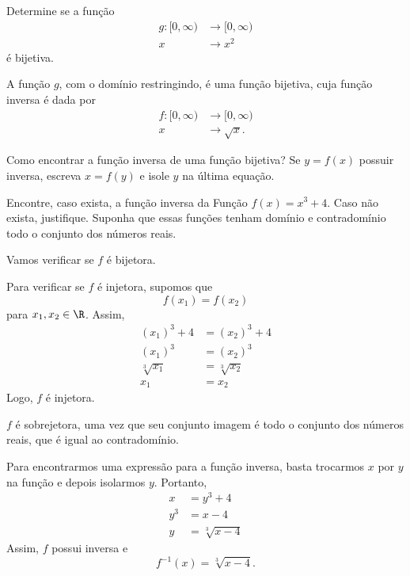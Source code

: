 \begin{example}
  Determine se a função
  \begin{align*}
    g\colon [0, \infty) & \to [0, \infty) \\
    x                   & \to  x^2
  \end{align*}
  é bijetiva.

  \solution
  A função $g$, com o domínio restringindo, é uma função bijetiva,
  cuja função inversa é dada por
  \begin{align*}
    f\colon [0, \infty) & \to [0, \infty) \\
    x                   & \to \sqrt{x}.
  \end{align*}
\end{example}

Como encontrar a função inversa de uma função bijetiva? Se $y=f(x)$ possuir
inversa, escreva $x=f(y)$ e isole $y$ na última equação.

\begin{example}
  Encontre, caso exista, a função inversa da Função
  \(
    f(x) = x^3 + 4
  \).
  Caso não exista, justifique. Suponha que essas funções tenham domínio e
  contradomínio todo o conjunto dos números reais.

  \solution
  Vamos verificar se $f$ é bijetora.

  Para verificar se $f$ é injetora, supomos que
  \[
    f(x_1) = f(x_2)
  \]
  para $x_1, x_2 \in \R$. Assim,
  \begin{align*}
    (x_1)^3+4     & = (x_2)^3+4     \\
    (x_1)^3       & = (x_2)^3       \\
    \sqrt[3]{x_1} & = \sqrt[3]{x_2} \\
    x_1           & = x_2
  \end{align*}
  Logo, $f$ é injetora.

  $f$ é sobrejetora, uma vez que seu conjunto imagem é todo o
  conjunto dos números reais, que é igual ao contradomínio.

  Para encontrarmos uma expressão para a função inversa, basta trocarmos $x$
  por $y$ na função e depois isolarmos $y$. Portanto,
  \begin{align*}
    x   & = y^3+4               \\
    y^3 & = x-4                 \\
    y   & = \sqrt[3]{x-4}
  \end{align*}
  Assim, $f$ possui inversa e
  \[
    f^{-1}(x)=\sqrt[3]{x-4}.
  \]
\end{example}

